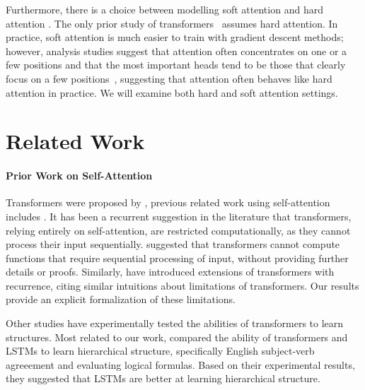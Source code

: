 \documentclass[11pt,a4paper]{article}
\begin{document}
Furthermore, there is a choice between modelling soft attention and hard attention \cite{shen2018reinforced,perez2019turing}.
The only prior study of transformers~\cite{perez2019turing} assumes hard attention.
In practice, soft attention is much easier to train with gradient descent methods; however, analysis studies suggest that attention often concentrates on one or a few positions \cite{voita2019analyzing,clark2019bert} and that the most important heads tend to be those that clearly focus on a few positions~\cite{voita2019analyzing}, suggesting that attention often behaves  like hard attention in practice. %
We will  examine both hard and soft attention settings.

\section{Related Work}
\paragraph{Prior Work on Self-Attention}
Transformers were proposed by \citet{vaswani2017attention}, previous related work using self-attention includes \citet{cheng2016long,parikh2016decomposable,paulus2017deep,lin2017structured}.
It has been a recurrent suggestion in the literature that transformers, relying entirely on self-attention, are restricted computationally, as they cannot process their input sequentially.
\citet{dehghani2018universal} suggested that %
transformers cannot compute functions that require sequential processing of input, without providing further details or proofs.
Similarly, \citet{shen2018disan,chen2018best,hao2019modeling} have introduced extensions of transformers with recurrence, citing similar intuitions about limitations of transformers.
Our results provide an explicit formalization of these limitations.

Other studies have experimentally tested the abilities of transformers to learn structures.
Most related to our work, \citet{tran2018importance} compared the ability of transformers and LSTMs to learn hierarchical structure, specifically English subject-verb agreeement and evaluating logical formulas.
Based on their experimental results, they suggested that LSTMs are better at learning hierarchical structure.
\end{document}
